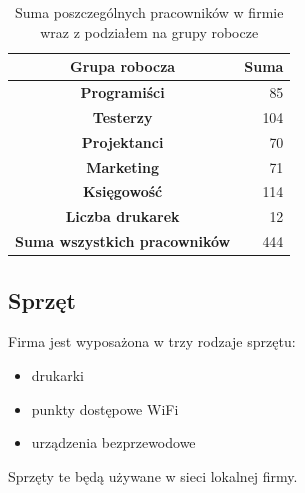 \documentclass[a4paper,12pt]{extarticle}  %
\begin{document}
\begin{table}[H]
	\centering
	\caption{Suma poszczególnych pracowników w firmie wraz z podziałem na grupy robocze}
	\vspace{2mm}
	\begin{tabular}{|c|r|}\hline
		\textbf{Grupa robocza}               & \multicolumn{1}{l|}{\textbf{Suma}} \bigstrut \\\hline
		\textbf{Programiści}                 & 85 \bigstrut                                 \\\hline
		\textbf{Testerzy}                    & 104 \bigstrut                                \\\hline
		\textbf{Projektanci}                 & 70 \bigstrut                                 \\\hline
		\textbf{Marketing}                   & 71 \bigstrut                                 \\\hline
		\textbf{Księgowość}                  & 114 \bigstrut                                \\\hline
		\textbf{Liczba drukarek}             & 12 \bigstrut                                 \\\hline
		\textbf{Suma wszystkich pracowników} & 444 \bigstrut                                \\\hline
	\end{tabular}%
	\label{tab:groups_sum}%
\end{table}%

\subsection{Sprzęt}
Firma jest wyposażona w trzy rodzaje sprzętu:
\begin{itemize}
	\item drukarki
	\item punkty dostępowe WiFi
	\item urządzenia bezprzewodowe
\end{itemize}
Sprzęty te będą używane w sieci lokalnej firmy.
\end{document}
